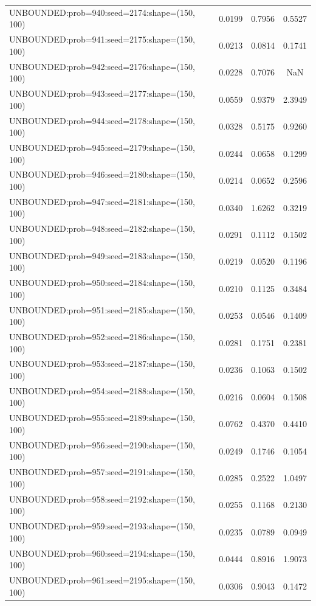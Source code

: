 \begin{longtable}{lccc}
UNBOUNDED:prob=940:seed=2174:shape=(150, 100) &   0.0199 &  0.7956 &  0.5527 \\
UNBOUNDED:prob=941:seed=2175:shape=(150, 100) &   0.0213 &  0.0814 &  0.1741 \\
UNBOUNDED:prob=942:seed=2176:shape=(150, 100) &   0.0228 &  0.7076 &     NaN \\
UNBOUNDED:prob=943:seed=2177:shape=(150, 100) &   0.0559 &  0.9379 &  2.3949 \\
UNBOUNDED:prob=944:seed=2178:shape=(150, 100) &   0.0328 &  0.5175 &  0.9260 \\
UNBOUNDED:prob=945:seed=2179:shape=(150, 100) &   0.0244 &  0.0658 &  0.1299 \\
UNBOUNDED:prob=946:seed=2180:shape=(150, 100) &   0.0214 &  0.0652 &  0.2596 \\
UNBOUNDED:prob=947:seed=2181:shape=(150, 100) &   0.0340 &  1.6262 &  0.3219 \\
UNBOUNDED:prob=948:seed=2182:shape=(150, 100) &   0.0291 &  0.1112 &  0.1502 \\
UNBOUNDED:prob=949:seed=2183:shape=(150, 100) &   0.0219 &  0.0520 &  0.1196 \\
UNBOUNDED:prob=950:seed=2184:shape=(150, 100) &   0.0210 &  0.1125 &  0.3484 \\
UNBOUNDED:prob=951:seed=2185:shape=(150, 100) &   0.0253 &  0.0546 &  0.1409 \\
UNBOUNDED:prob=952:seed=2186:shape=(150, 100) &   0.0281 &  0.1751 &  0.2381 \\
UNBOUNDED:prob=953:seed=2187:shape=(150, 100) &   0.0236 &  0.1063 &  0.1502 \\
UNBOUNDED:prob=954:seed=2188:shape=(150, 100) &   0.0216 &  0.0604 &  0.1508 \\
UNBOUNDED:prob=955:seed=2189:shape=(150, 100) &   0.0762 &  0.4370 &  0.4410 \\
UNBOUNDED:prob=956:seed=2190:shape=(150, 100) &   0.0249 &  0.1746 &  0.1054 \\
UNBOUNDED:prob=957:seed=2191:shape=(150, 100) &   0.0285 &  0.2522 &  1.0497 \\
UNBOUNDED:prob=958:seed=2192:shape=(150, 100) &   0.0255 &  0.1168 &  0.2130 \\
UNBOUNDED:prob=959:seed=2193:shape=(150, 100) &   0.0235 &  0.0789 &  0.0949 \\
UNBOUNDED:prob=960:seed=2194:shape=(150, 100) &   0.0444 &  0.8916 &  1.9073 \\
UNBOUNDED:prob=961:seed=2195:shape=(150, 100) &   0.0306 &  0.9043 &  0.1472 \\

\end{longtable}
